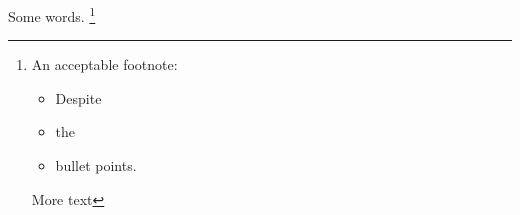 \documentclass{article}
\begin{document}
Some words.%
  \footnote{An acceptable footnote:
  \begin{itemize}
  \item Despite
  \item the
  \item bullet points.
  \end{itemize}More text }
\end{document}
